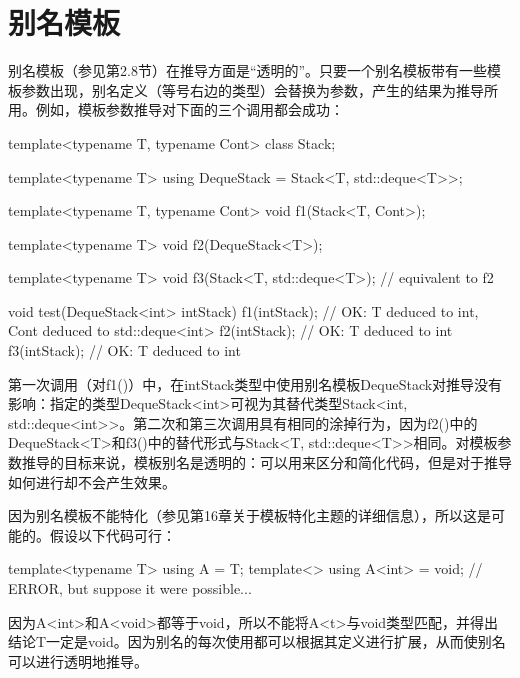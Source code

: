 \section{别名模板}
别名模板（参见第2.8节）在推导方面是“透明的”。只要一个别名模板带有一些模板参数出现，别名定义（等号右边的类型）会替换为参数，产生的结果为推导所用。例如，模板参数推导对下面的三个调用都会成功：

\begin{cpp}
template<typename T, typename Cont>
class Stack;

template<typename T>
using DequeStack = Stack<T, std::deque<T>>;

template<typename T, typename Cont>
void f1(Stack<T, Cont>);

template<typename T>
void f2(DequeStack<T>);

template<typename T>
void f3(Stack<T, std::deque<T>); // equivalent to f2

void test(DequeStack<int> intStack) {
	f1(intStack); // OK: T deduced to int, Cont deduced to std::deque<int>
	f2(intStack); // OK: T deduced to int
	f3(intStack); // OK: T deduced to int
}
\end{cpp}

第一次调用（对f1()）中，在intStack类型中使用别名模板DequeStack对推导没有影响：指定的类型DequeStack<int>可视为其替代类型Stack<int, std::deque<int>{}>。第二次和第三次调用具有相同的涂掉行为，因为f2()中的DequeStack<T>和f3()中的替代形式与Stack<T, std::deque<T>{}>相同。对模板参数推导的目标来说，模板别名是透明的：可以用来区分和简化代码，但是对于推导如何进行却不会产生效果。

因为别名模板不能特化（参见第16章关于模板特化主题的详细信息），所以这是可能的。假设以下代码可行：

\begin{cpp}
template<typename T> using A = T;
template<> using A<int> = void; // ERROR, but suppose it were possible...
\end{cpp}

因为A<int>和A<void>都等于void，所以不能将A<t>与void类型匹配，并得出结论T一定是void。因为别名的每次使用都可以根据其定义进行扩展，从而使别名可以进行透明地推导。


























